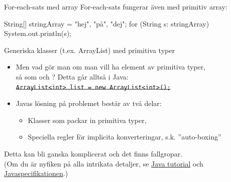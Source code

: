 \begin{Slide}{For-each-sats med array}
For-each-sats fungerar även med primitiv array:
\begin{Code}[numberstyle=,language=Java]
        String[] stringArray = {"hej", "på", "dej"};
        for (String s: stringArray) {
            System.out.println(s);
        }
\end{Code}
\end{Slide}








\begin{Slide}{Generiska klasser (t.ex. ArrayList) med primitiva typer}
\begin{itemize}\footnotesize
\item Men vad gör man om man vill ha element av primitiva typer, \\ så som  och ?
Detta går alltså  i Java: \\
\sout{\texttt{ArrayList<int> list = new ArrayList<int>();}}

\vspace{2em}
\item Javas lösning på problemet består av två delar:
\begin{itemize}\footnotesize
\item Klasser som packar in primitiva typer, 
\item Speciella regler för implicita konverteringar, s.k. ''auto-boxing'' 
\end{itemize}
\end{itemize}
\scriptsize\vspace{1em}
Detta kan bli ganska komplicerat och det finns fallgropar.\\
(Om du är nyfiken på alla intrikata detaljer, se
\href{https://docs.oracle.com/javase/tutorial/java/data/autoboxing.html}{Java tutorial} och   \href{https://docs.oracle.com/javase/specs/jls/se8/html/jls-5.html#jls-5.1.7}{Javaspecifikationen}.)
\end{Slide}

